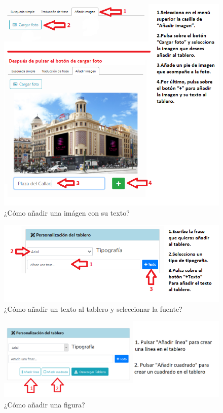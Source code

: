 \begin{figure}[h!]
	\centering
	\includegraphics[width=0.7\linewidth]{Imagenes/Bitmap/Tarea4-Pista1}
	\caption{¿Cómo añadir una imágen con su texto?}
	\label{fig:tarea4-pista1}
\end{figure}

\begin{figure}[h!]
	\centering
	\includegraphics[width=0.7\linewidth]{Imagenes/Bitmap/Tarea4-Pista2}
	\caption{¿Cómo añadir un texto al tablero y seleccionar la fuente?}
	\label{fig:tarea4-pista2}
\end{figure}


\begin{figure}[h!]
	\centering
	\includegraphics[width=0.7\linewidth]{Imagenes/Bitmap/Tarea4-Pista3}
	\caption{¿Cómo añadir una figura?}
	\label{fig:tarea4-pista3}
\end{figure}



